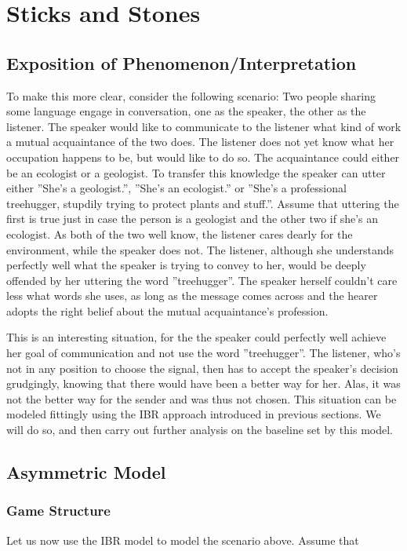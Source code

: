 \documentclass[10]{article}
\begin{document}
\section{Sticks and Stones}
\subsection{Exposition of Phenomenon/Interpretation}

To make this more clear, consider the following scenario: Two people sharing some language engage in conversation, one as the speaker, the other as the listener. The speaker would like to communicate to the listener what kind of work a mutual acquaintance of the two does. The listener does not yet know what her occupation happens to be, but would like to do so. The acquaintance could either be an ecologist or a geologist. To transfer this knowledge the speaker can utter either ''She's a geologist.'', ''She's an ecologist.'' or ''She's a professional treehugger, stupdily trying to protect plants and stuff.''. Assume that uttering the first is true just in case the person is a geologist and the other two if she's an ecologist. As both of the two well know, the listener cares dearly for the environment, while the speaker does not. The listener, although she understands perfectly well what the speaker is trying to convey to her, would be deeply offended by her uttering the word ''treehugger''. The speaker herself couldn't care less what words she uses, as long as the message comes across and the hearer adopts the right belief about the mutual acquaintance's profession.

This is an interesting situation, for the the speaker could perfectly well achieve her goal of communication and not use the word ''treehugger''. The listener, who's not in any position to choose the signal, then has to accept the speaker's decision grudgingly, knowing that there would have been a better way for her. Alas, it was not the better way for the sender and was thus not chosen. This situation can be modeled fittingly using the IBR approach introduced in previous sections. We will do so, and then carry out further analysis on the baseline set by this model.
%
\subsection{Asymmetric Model}
\subsubsection{Game Structure}
Let us now use the IBR model to model the scenario above. Assume that
\end{document}
